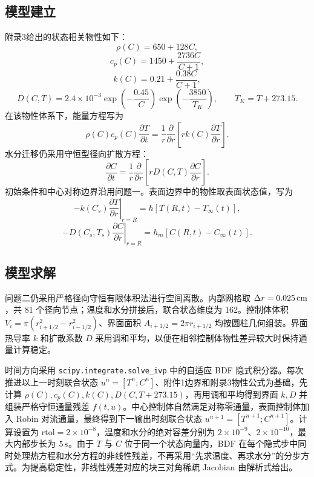 \documentclass[UTF8,a4paper,12pt]{ctexart}
\numberwithin{equation}{section}
\begin{document}
\subsection{模型建立}
附录3给出的状态相关物性如下：
\begin{equation}
  \rho(C)=650+128C,
\end{equation}
\begin{equation}
  c_p(C)=1450+\frac{2736C}{C+1},
\end{equation}
\begin{equation}
  k(C)=0.21+\frac{0.38C}{C+1},
\end{equation}
\begin{equation}
  D(C,T)=2.4\times10^{-3}\exp\left(-\frac{0.45}{C}\right)
  \exp\left(-\frac{3850}{T_K}\right),\qquad T_K=T+273.15.
\end{equation}
在该物性体系下，能量方程写为
\begin{equation}
  \rho(C)c_p(C)\frac{\partial T}{\partial t}
  =\frac1r\frac{\partial}{\partial r}
  \left[rk(C)\frac{\partial T}{\partial r}\right].
\end{equation}
水分迁移仍采用守恒型径向扩散方程：
\begin{equation}
  \frac{\partial C}{\partial t}
  =\frac1r\frac{\partial}{\partial r}
  \left[rD(C,T)\frac{\partial C}{\partial r}\right].
\end{equation}
初始条件和中心对称边界沿用问题一。表面边界中的物性取表面状态值，写为
\begin{equation}
  -k(C_s)\left.\frac{\partial T}{\partial r}\right|_{r=R}
  =h\left[T(R,t)-T_\infty(t)\right],
\end{equation}
\begin{equation}
  -D(C_s,T_s)\left.\frac{\partial C}{\partial r}\right|_{r=R}
  =h_m\left[C(R,t)-C_\infty(t)\right].
\end{equation}

\subsection{模型求解}
问题二仍采用严格径向守恒有限体积法进行空间离散。内部网格取 $\Delta r=0.025\rm\,cm$，共 81 个径向节点；温度和水分拼接后，联合状态维度为 162。控制体体积 $V_i=\pi(r_{i+1/2}^2-r_{i-1/2}^2)$、界面面积 $A_{i+1/2}=2\pi r_{i+1/2}$ 均按圆柱几何组装。界面热导率 $k$ 和扩散系数 $D$ 采用调和平均，以便在相邻控制体物性差异较大时保持通量计算稳定。

时间方向采用 \texttt{scipy.integrate.solve\_ivp} 中的自适应 BDF 隐式积分器。每次推进以上一时刻联合状态 $u^n=[T^n;C^n]$、附件1边界和附录3物性公式为基础，先计算 $\rho(C),c_p(C),k(C),D(C,T+273.15)$，再用调和平均得到界面 $k,D$ 并组装严格守恒通量残差 $f(t,u)$。中心控制体自然满足对称零通量，表面控制体加入 Robin 对流通量，最终得到下一输出时刻联合状态 $u^{n+1}=[T^{n+1};C^{n+1}]$。计算设置为 $\mathrm{rtol}=2\times10^{-8}$，温度和水分的绝对容差分别为 $2\times10^{-9}$、$2\times10^{-10}$，最大内部步长为 $5\rm\,s$。由于 $T$ 与 $C$ 位于同一个状态向量内，BDF 在每个隐式步中同时处理热方程和水分方程的非线性残差，不再采用“先求温度、再求水分”的分步方式。为提高稳定性，非线性残差对应的块三对角稀疏 Jacobian 由解析式给出。
\end{document}
